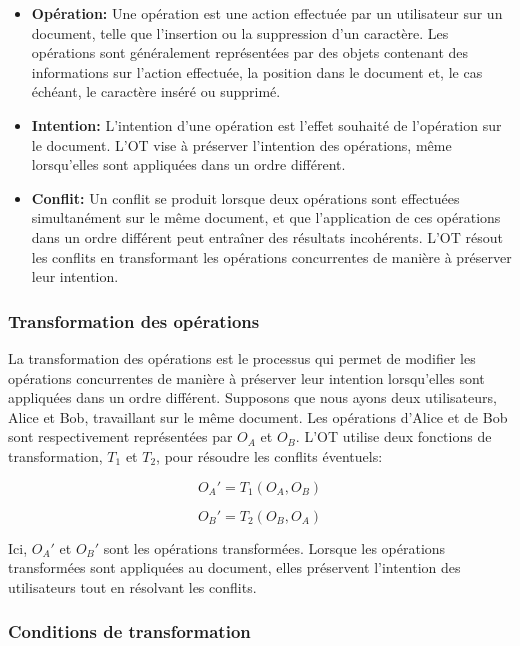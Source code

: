 \begin{itemize}
    \item \textbf{Opération:} Une opération est une action effectuée par un utilisateur sur un document, telle que l'insertion ou la suppression d'un caractère. Les opérations sont généralement représentées par des objets contenant des informations sur l'action effectuée, la position dans le document et, le cas échéant, le caractère inséré ou supprimé.
    \item \textbf{Intention:} L'intention d'une opération est l'effet souhaité de l'opération sur le document. L'OT vise à préserver l'intention des opérations, même lorsqu'elles sont appliquées dans un ordre différent.
    \item \textbf{Conflit:} Un conflit se produit lorsque deux opérations sont effectuées simultanément sur le même document, et que l'application de ces opérations dans un ordre différent peut entraîner des résultats incohérents. L'OT résout les conflits en transformant les opérations concurrentes de manière à préserver leur intention.
\end{itemize}

\subsubsection{Transformation des opérations}

La transformation des opérations est le processus qui permet de modifier les opérations concurrentes de manière à préserver leur intention lorsqu'elles sont appliquées dans un ordre différent. Supposons que nous ayons deux utilisateurs, Alice et Bob, travaillant sur le même document. Les opérations d'Alice et de Bob sont respectivement représentées par $O_A$ et $O_B$. L'OT utilise deux fonctions de transformation, $T_1$ et $T_2$, pour résoudre les conflits éventuels:

\begin{equation}
    O_A' = T_1(O_A, O_B)
\end{equation}

\begin{equation}
    O_B' = T_2(O_B, O_A)
\end{equation}

Ici, $O_A'$ et $O_B'$ sont les opérations transformées. Lorsque les opérations transformées sont appliquées au document, elles préservent l'intention des utilisateurs tout en résolvant les conflits.

\subsubsection{Conditions de transformation}


